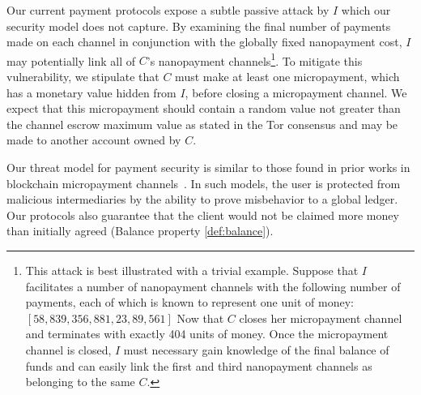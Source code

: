 Our current payment protocols expose a subtle passive attack by $I$ which our security model does not capture. By examining
the final number of payments made on each channel in conjunction with the
globally fixed nanopayment cost, $I$ may potentially link all of $C$'s
nanopayment channels\footnote{This attack is best illustrated with a trivial
  example. Suppose that $I$ facilitates a number of nanopayment channels with
  the following number of payments, each of which is known to represent one unit
  of money: $[58, 839, 356, 881, 23, 89, 561]$ Now that $C$ closes her
  micropayment channel and terminates with exactly 404 units of money. Once the
  micropayment channel is closed, $I$ must necessary gain knowledge of the final
  balance of funds and can easily link the first and third nanopayment channels
  as belonging to the same $C$.}. To mitigate this vulnerability, we stipulate
that $C$ must make at least one micropayment, which has a monetary value hidden
from $I$, before closing a micropayment channel. We expect that this
micropayment should contain a random value not greater than the channel escrow
maximum value as stated in the Tor consensus and may be made to another account
owned by $C$.

Our threat model for payment security is similar to those found in prior works
in blockchain micropayment channels~\cite{poon2016bitcoin}. In such models, the
user is protected from malicious intermediaries by the ability to prove
misbehavior to a global ledger. Our protocols also guarantee that the client would not be claimed more money than initially agreed (Balance property \ref{def:balance}).
%


